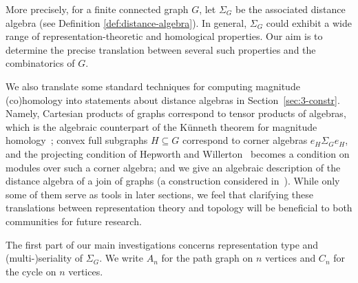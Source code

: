 \documentclass[a4paper,leqno]{amsart}
\begin{document}
More precisely, for a finite connected graph $G$, let $\Sigma_G$ be the associated distance algebra (see Definition \ref{def:distance-algebra}).  
In general, $\Sigma_G$ could exhibit a wide range of representation-theoretic and homological properties.
Our aim is to determine the precise translation between several such properties and the combinatorics of $G$.

We also translate some standard techniques for computing magnitude (co)homology into statements about distance algebras 
in Section~\ref{sec:3-constr}.  Namely, Cartesian products of graphs correspond to tensor products of algebras, which is the algebraic counterpart of the K\"unneth theorem for magnitude homology~\cite{HW17}; convex full subgraphs $H\subseteq G$ correspond to corner algebras $e_H\Sigma_Ge_H$, and the projecting condition of Hepworth and Willerton~\cite{HW17} becomes a condition on modules over such a corner algebra; and we give an algebraic description of the distance algebra of a join of graphs (a construction considered in~\cite{HW17}).  While only some of them serve as tools in later sections, we feel that clarifying these translations between representation theory and topology will be beneficial to both communities for future research.

The first part of our main investigations concerns representation type and (multi-)seriality of $\Sigma_G$.  We write $A_n$ for the path graph  on $n$ vertices and $C_n$ for the cycle on $n$ vertices. 
\end{document}
